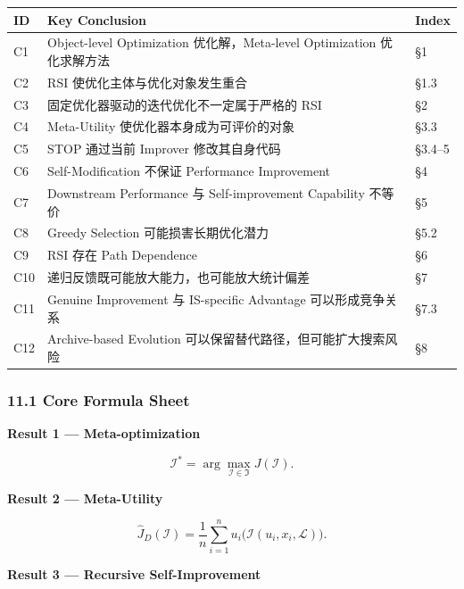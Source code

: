 \begin{readertable}
\begin{longtable}[]{@{}
  >{\raggedright\arraybackslash}p{}
  >{\raggedright\arraybackslash}p{}
  >{\raggedright\arraybackslash}p{}@{}}
\toprule
ID & Key Conclusion & Index \\
\midrule
\endhead
C1 & Object-level Optimization 优化解，Meta-level Optimization 优化求解方法 & §1 \\
C2 & RSI 使优化主体与优化对象发生重合 & §1.3 \\
C3 & 固定优化器驱动的迭代优化不一定属于严格的 RSI & §2 \\
C4 & Meta-Utility 使优化器本身成为可评价的对象 & §3.3 \\
C5 & STOP 通过当前 Improver 修改其自身代码 & §3.4--5 \\
C6 & Self-Modification 不保证 Performance Improvement & §4 \\
C7 & Downstream Performance 与 Self-improvement Capability 不等价 & §5 \\
C8 & Greedy Selection 可能损害长期优化潜力 & §5.2 \\
C9 & RSI 存在 Path Dependence & §6 \\
C10 & 递归反馈既可能放大能力，也可能放大统计偏差 & §7 \\
C11 & Genuine Improvement 与 IS-specific Advantage 可以形成竞争关系 & §7.3 \\
C12 & Archive-based Evolution 可以保留替代路径，但可能扩大搜索风险 & §8 \\
\bottomrule
\end{longtable}
\end{readertable}

\hypertarget{part-3-37-0001-core-formula-sheet}{%
\subsubsection{11.1 Core Formula Sheet}\label{part-3-37-0001-core-formula-sheet}}

\textbf{Result 1 --- Meta-optimization}

\[\mathcal I^*
=
\arg\max_{\mathcal I\in\mathfrak I}
J(\mathcal I).\]

\textbf{Result 2 --- Meta-Utility}

\[\widehat J_D(\mathcal I)
=
\frac1n\sum_{i=1}^{n}
u_i\big(\mathcal I(u_i,x_i,\mathcal L)\big).\]

\textbf{Result 3 --- Recursive Self-Improvement}

